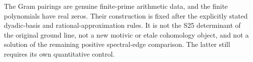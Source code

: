 The Gram pairings are genuine finite-prime arithmetic data, and the
finite polynomials have real zeros.  Their construction is fixed after
the explicitly stated dyadic-basis and rational-approximation rules.
It is not the S25 determinant of the original ground line, not a new
motivic or etale cohomology object, and not a solution of the remaining
positive spectral-edge comparison.  The latter still requires its
own quantitative control.

